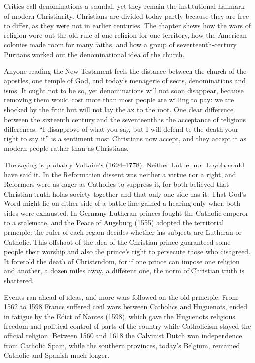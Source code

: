 
\begin{inbrief}
Critics call denominations a scandal, yet they remain the institutional hallmark of modern
Christianity. Christians are divided today partly because they are free to differ, as they were not
in earlier centuries. The chapter shows how the wars of religion wore out the old rule of one
religion for one territory, how the American colonies made room for many faiths, and how a group of
seventeenth-century Puritans worked out the denominational idea of the church.
\end{inbrief}

Anyone reading the New Testament feels the distance between the church of the apostles, one temple of
God, and today's menagerie of sects, denominations and isms. It ought not to be so, yet denominations
will not soon disappear, because removing them would cost more than most people are willing to pay:
we are shocked by the fruit but will not lay the ax to the root. One clear difference between the
sixteenth century and the seventeenth is the acceptance of religious differences. ``I disapprove of
what you say, but I will defend to the death your right to say it'' is a sentiment most Christians
now accept, and they accept it as modern people rather than as Christians.

The saying is probably Voltaire's (1694--1778). Neither Luther nor Loyola could have said it. In the
Reformation dissent was neither a virtue nor a right, and Reformers were as eager as Catholics to
suppress it, for both believed that Christian truth holds society together and that only one side
has it. That God's Word might lie on either side of a battle line gained a hearing only when both
sides were exhausted. In Germany Lutheran princes fought the Catholic emperor to a stalemate, and the
Peace of Augsburg (1555) adopted the territorial principle: the ruler of each region decides whether
his subjects are Lutheran or Catholic. This offshoot of the idea of the Christian prince guaranteed
some people their worship and also the prince's right to persecute those who disagreed. It foretold
the death of Christendom, for if one prince can impose one religion and another, a dozen miles away,
a different one, the norm of Christian truth is shattered.

Events ran ahead of ideas, and more wars followed on the old principle. From 1562 to 1598 France
suffered civil wars between Catholics and Huguenots, ended in fatigue by the Edict of Nantes (1598),
which gave the Huguenots religious freedom and political control of parts of the country while
Catholicism stayed the official religion. Between 1560 and 1618 the Calvinist Dutch won independence
from Catholic Spain, while the southern provinces, today's Belgium, remained Catholic and Spanish
much longer.

